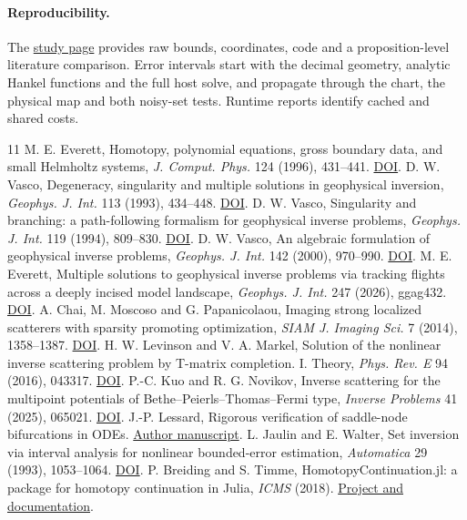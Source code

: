 \documentclass[10pt]{article}
\begin{document}
\paragraph{Reproducibility.}
The \href{https://migodam.github.io/b1-probabilistic-maxwell-imaging/research/z_alg_host_fold/}{study page} provides raw bounds, coordinates, code and a proposition-level literature comparison. Error intervals start with the decimal geometry, analytic Hankel functions and the full host solve, and propagate through the chart, the physical map and both noisy-set tests. Runtime reports identify cached and shared costs.

\begin{thebibliography}{11}\small
{} M. E. Everett, Homotopy, polynomial equations, gross boundary data, and small Helmholtz systems, \emph{J. Comput. Phys.} 124 (1996), 431--441. \href{https://doi.org/10.1006/jcph.1996.0070}{DOI}.
 D. W. Vasco, Degeneracy, singularity and multiple solutions in geophysical inversion, \emph{Geophys. J. Int.} 113 (1993), 434--448. \href{https://doi.org/10.1111/j.1365-246X.1993.tb00898.x}{DOI}.
 D. W. Vasco, Singularity and branching: a path-following formalism for geophysical inverse problems, \emph{Geophys. J. Int.} 119 (1994), 809--830. \href{https://doi.org/10.1111/j.1365-246X.1994.tb04019.x}{DOI}.
 D. W. Vasco, An algebraic formulation of geophysical inverse problems, \emph{Geophys. J. Int.} 142 (2000), 970--990. \href{https://doi.org/10.1046/j.1365-246x.2000.00188.x}{DOI}.
 M. E. Everett, Multiple solutions to geophysical inverse problems via tracking flights across a deeply incised model landscape, \emph{Geophys. J. Int.} 247 (2026), ggag432. \href{https://doi.org/10.1093/gji/ggag432}{DOI}.
 A. Chai, M. Moscoso and G. Papanicolaou, Imaging strong localized scatterers with sparsity promoting optimization, \emph{SIAM J. Imaging Sci.} 7 (2014), 1358--1387. \href{https://doi.org/10.1137/130943200}{DOI}.
 H. W. Levinson and V. A. Markel, Solution of the nonlinear inverse scattering problem by T-matrix completion. I. Theory, \emph{Phys. Rev. E} 94 (2016), 043317. \href{https://doi.org/10.1103/PhysRevE.94.043317}{DOI}.
 P.-C. Kuo and R. G. Novikov, Inverse scattering for the multipoint potentials of Bethe--Peierls--Thomas--Fermi type, \emph{Inverse Problems} 41 (2025), 065021. \href{https://doi.org/10.1088/1361-6420/ade282}{DOI}.
 J.-P. Lessard, Rigorous verification of saddle-node bifurcations in ODEs. \href{https://www.math.mcgill.ca/jplessard/Publications_files/saddle_node.pdf}{Author manuscript}.
 L. Jaulin and E. Walter, Set inversion via interval analysis for nonlinear bounded-error estimation, \emph{Automatica} 29 (1993), 1053--1064. \href{https://doi.org/10.1016/0005-1098(93)90106-4}{DOI}.
 P. Breiding and S. Timme, HomotopyContinuation.jl: a package for homotopy continuation in Julia, \emph{ICMS} (2018). \href{https://www.juliahomotopycontinuation.org/}{Project and documentation}.
\end{thebibliography}
\end{document}
